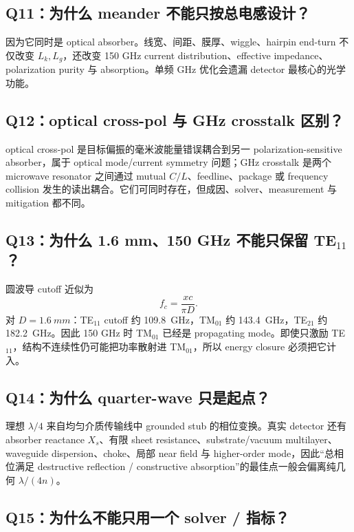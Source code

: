 \documentclass[11pt,a4paper,openany]{ctexrep}
\begin{document}
\subsection*{Q11：为什么 meander 不能只按总电感设计？}

因为它同时是 optical absorber。线宽、间距、膜厚、wiggle、hairpin end-turn 不仅改变 $L_k,L_g$，还改变 150 GHz current distribution、effective impedance、polarization purity 与 absorption。单频 GHz 优化会遗漏 detector 最核心的光学功能。

\subsection*{Q12：optical cross-pol 与 GHz crosstalk 区别？}

optical cross-pol 是目标偏振的毫米波能量错误耦合到另一 polarization-sensitive absorber，属于 optical mode/current symmetry 问题；GHz crosstalk 是两个 microwave resonator 之间通过 mutual $C/L$、feedline、package 或 frequency collision 发生的读出耦合。它们可同时存在，但成因、solver、measurement 与 mitigation 都不同。

\subsection*{Q13：为什么 1.6 mm、150 GHz 不能只保留 TE$_{11}$？}

圆波导 cutoff 近似为
\[
f_c=\frac{x c}{\pi D}.
\]
对 $D=\SI{1.6}{mm}$：TE$_{11}$ cutoff 约 \SI{109.8}{GHz}，TM$_{01}$ 约 \SI{143.4}{GHz}，TE$_{21}$ 约 \SI{182.2}{GHz}。因此 150 GHz 时 TM$_{01}$ 已经是 propagating mode。即使只激励 TE$_{11}$，结构不连续性仍可能把功率散射进 TM$_{01}$，所以 energy closure 必须把它计入。

\subsection*{Q14：为什么 quarter-wave 只是起点？}

理想 $\lambda/4$ 来自均匀介质传输线中 grounded stub 的相位变换。真实 detector 还有 absorber reactance $X_s$、有限 sheet resistance、substrate/vacuum multilayer、waveguide dispersion、choke、局部 near field 与 higher-order mode，因此“总相位满足 destructive reflection / constructive absorption”的最佳点一般会偏离纯几何 $\lambda/(4n)$。

\subsection*{Q15：为什么不能只用一个 solver / 指标？}
\end{document}
